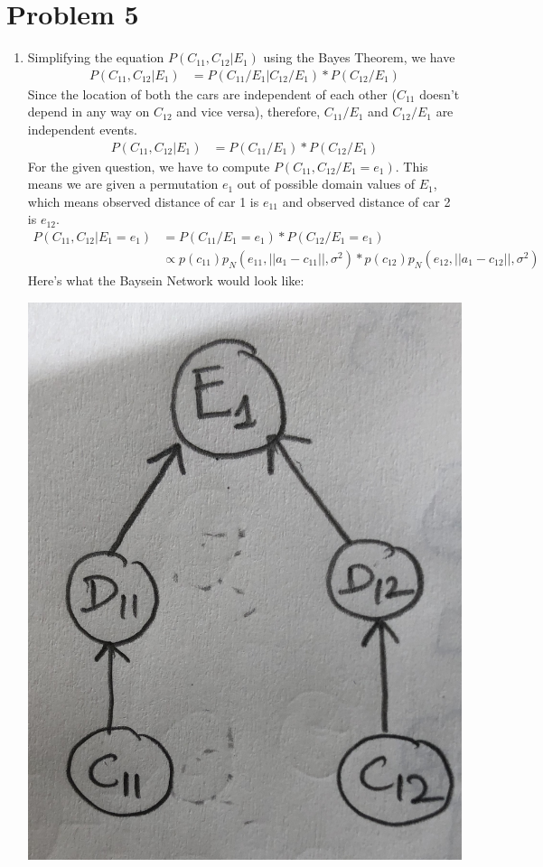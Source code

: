 \documentclass[12pt]{article}
\begin{document}
\section*{Problem 5}

\begin{enumerate}[label=(\alph*)]
  \item Simplifying the equation $P (C_{11}, C_{12} | E_1)$ using the Bayes Theorem, we have
  \begin{align*}
  P (C_{11}, C_{12} | E_1) &= P(C_{11}/E_1| C_{12}/E_1) * P(C_{12}/E_1)
  \end{align*}
  Since the location of both the cars are independent of each other ($C_{11}$ doesn't depend in any way on $C_{12}$ and vice versa), therefore, $C_{11}/E_1$ and $C_{12}/E_1$ are independent events.
  \begin{align*}
  P (C_{11}, C_{12} | E_1) &= P(C_{11}/E_1) * P(C_{12}/E_1)
  \end{align*}
  For the given question, we have to compute $P(C_{11}, C_{12} / E_1 = e_1)$. This means we are given a permutation $e_1$ out of possible domain values of $E_1$, which means observed distance of car 1 is $e_{11}$ and observed distance of car 2 is $e_{12}$.
    \begin{align*}
  P (C_{11}, C_{12} | E_1 = e_1) &= P(C_{11}/E_1 = e_1) * P(C_{12}/E_1 = e_1) \\
  &\propto p(c_{11})p_N (e_{11}, || a_1 - c_{11} ||, \sigma^2) * p(c_{12})p_N (e_{12}, || a_1 - c_{12} ||, \sigma^2)
  \end{align*}
  Here's what the Baysein Network would look like:
     \begin{center}
  \includegraphics[scale=0.1]{IMG_2302}

\end{center}
\end{enumerate}
\end{document}
